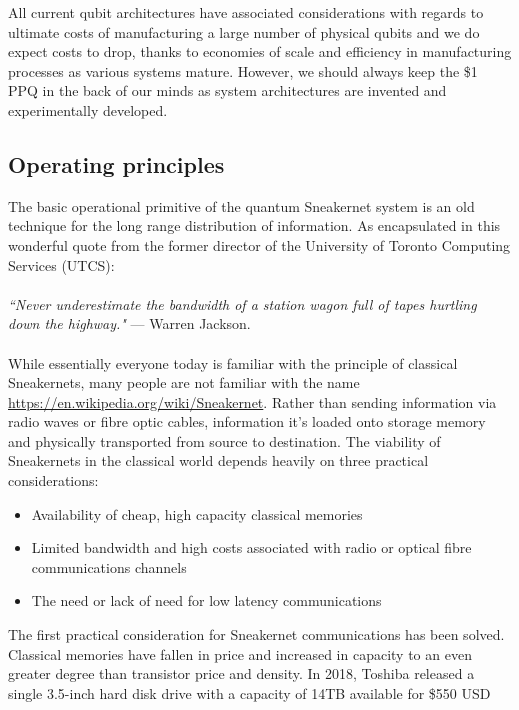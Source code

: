 \documentclass[twocolumn, aps, rmp, amsmath, amssymb, nofootinbib, superscriptaddress, longbibliography, floatfix, table-of-contents, eqsecnum]{revtex4-2}
\newcommand{\famousquote}[2]{\noindent\textit{``#1"} --- #2.\index{Quotes}\index{#2}}
\begin{document}
All current qubit architectures have associated considerations with regards to ultimate costs of manufacturing a large number of physical qubits and we do expect costs to drop, thanks to economies of scale and efficiency in manufacturing processes as various systems mature. However, we should always keep the \$1 PPQ in the back of our minds as system architectures are invented and experimentally developed. 

\subsection{Operating principles}

The basic operational primitive of the quantum Sneakernet system is an old technique for the long range distribution of information. As encapsulated in this wonderful quote from the former director of the University of Toronto Computing Services (UTCS):
\\
\\
\famousquote{Never underestimate the bandwidth of a station wagon full of tapes hurtling down the highway.}{Warren Jackson}
\\
\\
While essentially everyone today is familiar with the principle of classical Sneakernets, many people are not familiar with the name \href{https://en.wikipedia.org/wiki/Sneakernet}{https://en.wikipedia.org/wiki/Sneakernet}. Rather than sending information via radio waves or fibre optic cables, information it's loaded onto storage memory and physically transported from source to destination. The viability of Sneakernets in the classical world depends heavily on three practical considerations:
\begin{itemize}
\item Availability of cheap, high capacity classical memories
\item Limited bandwidth and high costs associated with radio or optical fibre communications channels
\item The need or lack of need for low latency communications 
\end{itemize}

The first practical consideration for Sneakernet communications has been solved. Classical memories have fallen in price and increased in capacity to an even greater degree than transistor price and density. In 2018, Toshiba released a single 3.5-inch hard disk drive with a capacity of 14TB available for \$550 USD %
\end{document}
